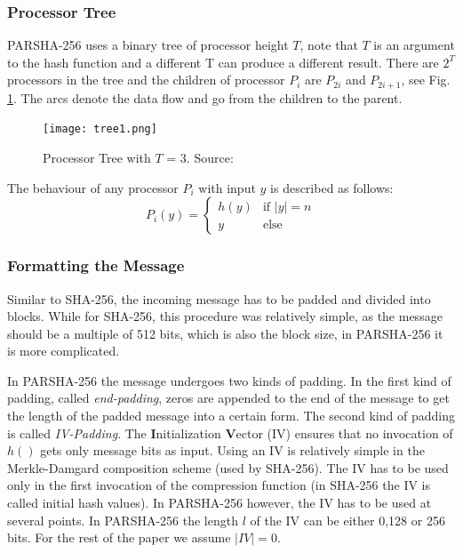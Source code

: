 \documentclass[letterpaper]{article}
\begin{document}
\subsubsection{Processor Tree}
PARSHA-256 uses a binary tree of processor height $T$, note that $T$ is an argument to the hash function and a different T can produce a different result. There are $2^T$ processors in the tree and the children of processor $P_i$ are $P_{2i}$ and $P_{2i+1}$, see Fig. \ref{fig:tree1}. The arcs denote the data flow and go from the children to the parent. 

\begin{figure}[h!]\centering

 \texttt{[image: tree1.png]}



  \caption{Processor Tree with $T$ = 3. Source: \cite{parsha256}}
  \label{fig:tree1}
\end{figure} 

The behaviour of any processor $P_i$ with input $y$ is described as follows:
\begin{equation}\label{eq_proc}
P_i(y) = \begin{cases}
h(y) & \text{if } |y| = n \\
y & \text{else}
\end{cases}
\end{equation}

\subsubsection{Formatting the Message}
Similar to SHA-256, the incoming message has to be padded and divided into blocks. While for SHA-256, this procedure was relatively simple, as the message should be a multiple of 512 bits, which is also the block size, in PARSHA-256 it is more complicated.

In PARSHA-256 the message undergoes two kinds of padding. In the first kind of padding, called \emph{end-padding}, zeros are appended to the end of the message to get the length of the padded message into a certain form. The second kind of padding is called \emph{IV-Padding}. The \textbf{I}nitialization \textbf{V}ector (IV) ensures that no invocation of $h()$ gets only message bits as input. Using an IV is relatively simple in the Merkle-Damgard composition scheme (used by SHA-256). The IV has to be used only in the first invocation of the compression function (in SHA-256 the IV is called initial hash values). In PARSHA-256 however, the IV has to be used at several points. In PARSHA-256 the length $l$ of the IV can be either 0,128 or 256 bits. For the rest of the paper we assume $|IV| = 0$.
\end{document}
